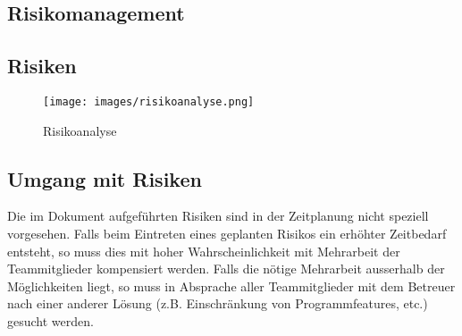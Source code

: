 \begin{landscape}
\section{Risikomanagement}
\subsection{Risiken}
\begin{figure}[H]
\centering
\texttt{[image: images/risikoanalyse.png]}
\caption{Risikoanalyse}
\end{figure}
\end{landscape}
\subsection{Umgang mit Risiken}
Die im Dokument aufgeführten Risiken sind in der Zeitplanung nicht speziell vorgesehen. Falls beim Eintreten eines geplanten Risikos ein erhöhter Zeitbedarf entsteht, so muss dies mit hoher Wahrscheinlichkeit mit Mehrarbeit der Teammitglieder kompensiert werden. Falls die nötige Mehrarbeit ausserhalb der Möglichkeiten liegt, so muss in Absprache aller Teammitglieder mit dem Betreuer nach einer anderer Lösung (z.B. Einschränkung von Programmfeatures, etc.) gesucht werden.